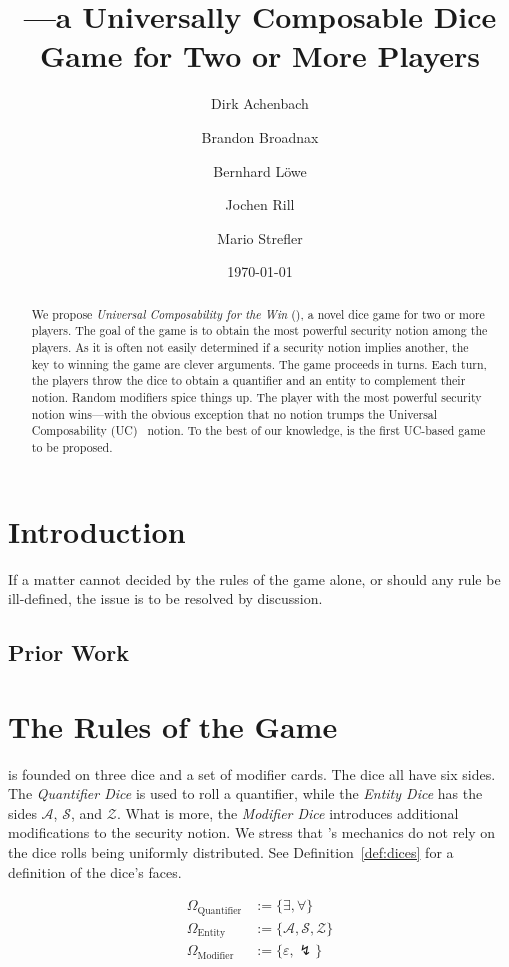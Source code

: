 \documentclass{llncs}
\title{\ucftw---a Universally Composable Dice Game for Two or More Players}
\date{\today}
\author{Dirk Achenbach\inst{1} \and Brandon Broadnax\inst{1} \and Bernhard Löwe\inst{1} \and Jochen Rill\inst{2} \and Mario Strefler\inst{1}}
\institute{Karlsruhe Institute of Technology (KIT) \and FZI Forschungszentrum Informatik}
\begin{document}
\maketitle
\begin{abstract}
	We propose \emph{Universal Composability for the Win} (\ucftw), a novel dice game for two or more players. 
	The goal of the game is to obtain the most powerful security notion among the players. 
	As it is often not easily determined if a security notion implies another, the key to winning the game are clever arguments.
	The game proceeds in turns. 
	Each turn, the players throw the dice to obtain a quantifier and an entity to complement their notion. 
	Random modifiers spice things up.
	The player with the most powerful security notion wins---with the obvious exception that no notion trumps the Universal Composability (UC)~\cite{can01,can05,can13} notion.
	To the best of our knowledge, \ucftw is the first UC-based game to be proposed.
\end{abstract}

\section{Introduction}
\begin{theorem}
  If a matter cannot decided by the rules of the game alone, or should any rule be ill-defined, the issue is to be resolved by discussion.
\end{theorem}

\subsection{Prior Work}

\section{The Rules of the Game}
\ucftw is founded on three dice and a set of modifier cards.
The dice all have six sides.
The \emph{Quantifier Dice} is used to roll a quantifier, while the \emph{Entity Dice} has the sides $\mathcal{A}$, $\mathcal{S}$, and $\mathcal{Z}$.
What is more, the \emph{Modifier Dice} introduces additional modifications to the security notion.
We stress that \ucftw's mechanics do not rely on the dice rolls being uniformly distributed.
See Definition~\ref{def:dices} for a definition of the dice's faces.
\begin{definition}
	\begin{align*}
		\Omega_\text{Quantifier} &:= \{\exists, \forall\}  \\
		\Omega_\text{Entity} &:= \{\mathcal{A}, \mathcal{S}, \mathcal{Z}\}  \\
		\Omega_\text{Modifier} &:= \{\varepsilon, \lightning\} 
	\end{align*}
	\label{def:dices}
\end{definition}
\end{document}
